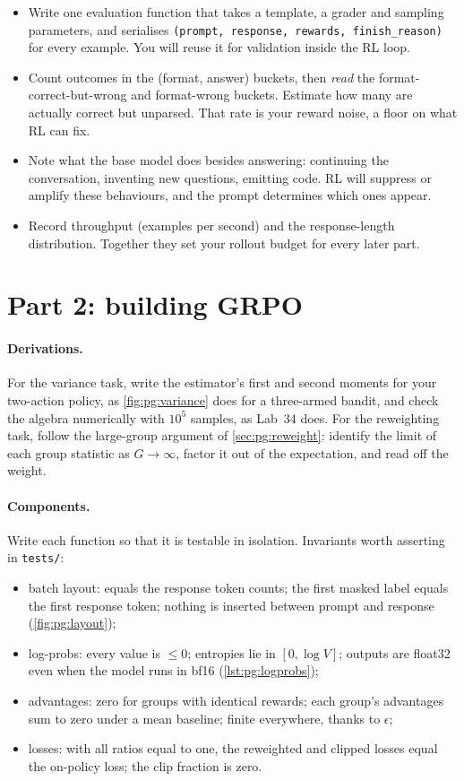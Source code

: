 \begin{itemize}
\item Write one evaluation function that takes a template, a grader and sampling parameters, and
  serialises \texttt{(prompt, response, rewards, finish\_reason)} for every example. You will reuse it
  for validation inside the RL loop.
\item Count outcomes in the (format, answer) buckets, then \emph{read} the format-correct-but-wrong
  and format-wrong buckets. Estimate how many are actually correct but unparsed. That rate is your
  reward noise, a floor on what RL can fix.
\item Note what the base model does besides answering: continuing the conversation, inventing new
  questions, emitting code. RL will suppress or amplify these behaviours, and the prompt determines
  which ones appear.
\item Record throughput (examples per second) and the response-length distribution. Together they
  set your rollout budget for every later part.
\end{itemize}

\section{Part 2: building GRPO}\label{sec:proj5:grpo}

\paragraph{Derivations.} For the variance task, write the estimator's first and second moments for
your two-action policy, as \cref{fig:pg:variance} does for a three-armed bandit, and check the algebra
numerically with $10^5$ samples, as Lab~34 does. For the reweighting task, follow the large-group
argument of \cref{sec:pg:reweight}: identify the limit of each group statistic as $G\to\infty$, factor
it out of the expectation, and read off the weight.

\paragraph{Components.} Write each function so that it is testable in isolation. Invariants worth
asserting in \texttt{tests/}:
\begin{itemize}
\item batch layout:  equals the response token counts; the first masked
  label equals the first response token; nothing is inserted between prompt and response
  (\cref{fig:pg:layout});
\item log-probs: every value is $\le0$; entropies lie in $[0,\log V]$; outputs are float32 even when the
  model runs in bf16 (\cref{lst:pg:logprobs});
\item advantages: zero for groups with identical rewards; each group's advantages sum to zero under a
  mean baseline; finite everywhere, thanks to $\epsilon$;
\item losses: with all ratios equal to one, the reweighted and clipped losses equal the on-policy loss;
  the clip fraction is zero.
\end{itemize}

